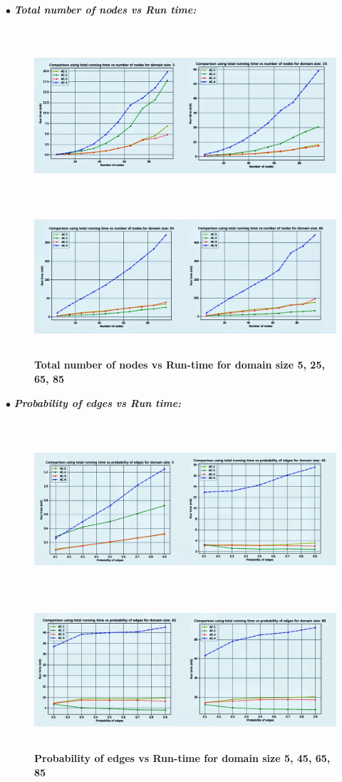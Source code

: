 \documentclass[12pt, english]{article}
\begin{document}
\hspace*{0.5cm}$\bullet$ \textit{\textbf{Total number of nodes vs Run time:}}
\begin{figure}[ht]
		{\includegraphics[width=\textwidth,height=2.6in]{11.jpeg}}
		{\includegraphics[width=\textwidth,height=2in]{22.jpeg}}
		\caption{\textbf{Total number of nodes vs Run-time for domain size 5, 25, 65, 85}}
        \label{fig: 1}
\end{figure}

\hspace*{0.5cm}$\bullet$ \textit{\textbf{Probability of edges vs Run time:}}
\begin{figure}[ht]
		{\includegraphics[width=\textwidth,height=2.6in]{44.jpeg}}
		{\includegraphics[width=\textwidth,height=2in]{33.jpeg}}
		\caption{\textbf{Probability of edges vs Run-time for domain size 5, 45, 65, 85}}
        \label{fig: 2}
\end{figure}
\end{document}
